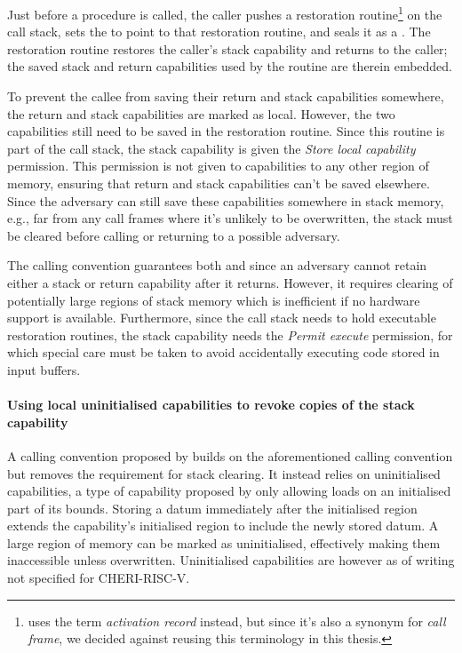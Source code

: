 \documentclass[main.tex]{subfiles}
\begin{document}
Just before a procedure is called, the caller pushes a restoration routine\footnote{\cite{retptr} uses the term \emph{activation record} instead, but since it's also a synonym for \emph{call frame}, we decided against reusing this terminology in this thesis.} on the call stack, sets the  to point to that restoration routine, and seals it as a . The restoration routine restores the caller's stack capability and returns to the caller; the saved stack and return capabilities used by the routine are therein embedded.

To prevent the callee from saving their return and stack capabilities somewhere, the return and stack capabilities are marked as local. However, the two capabilities still need to be saved in the restoration routine. Since this routine is part of the call stack, the stack capability is given the \emph{Store local capability} permission. This permission is not given to capabilities to any other region of memory, ensuring that return and stack capabilities can't be saved elsewhere. Since the adversary can still save these capabilities somewhere in stack memory, e.g., far from any call frames where it's unlikely to be overwritten, the stack must be cleared before calling or returning to a possible adversary.

The calling convention guarantees both  and  since an adversary cannot retain either a stack or return capability after it returns. However, it requires clearing of potentially large regions of stack memory which is inefficient if no hardware support is available. Furthermore, since the call stack needs to hold executable restoration routines, the stack capability needs the \emph{Permit execute} permission, for which special care must be taken to avoid accidentally executing code stored in input buffers.

\paragraph{Using local uninitialised capabilities to revoke copies of the stack capability} A calling convention proposed by \cite{uninitcapss,uninitcaps} builds on the aforementioned calling convention but removes the requirement for stack clearing. It instead relies on uninitialised capabilities, a type of capability proposed by \cite{uninitcapss} only allowing loads on an initialised part of its bounds. Storing a datum immediately after the initialised region extends the capability's initialised region to include the newly stored datum. A large region of memory can be marked as uninitialised, effectively making them inaccessible unless overwritten. Uninitialised capabilities are however as of writing not specified for CHERI-RISC-V.
\end{document}
